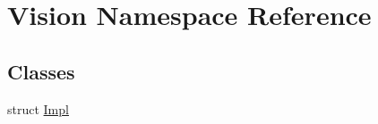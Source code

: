 \hypertarget{namespaceVision}{\section{Vision Namespace Reference}
\label{namespaceVision}
}
\subsection*{Classes}
\begin{DoxyCompactItemize}
\item 
struct \hyperlink{structVision_1_1Impl}{Impl}
\end{DoxyCompactItemize}
